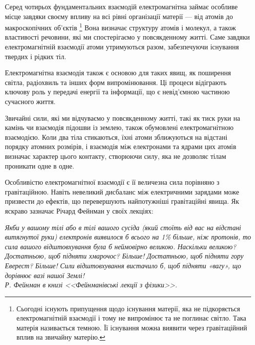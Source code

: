 Серед чотирьох фундаментальних взаємодій електромагнітна займає особливе місце завдяки своєму впливу на всі рівні організації матерії --- від атомів до
макроскопічних об’єктів
\footnote{Сьогодні існують припущення щодо існування матерії, яка не підкоряється електромагнітній взаємодії і тому не випромінює та не поглинає світло.
Така матерія називається темною. Її існування можна виявити через гравітаційний вплив на звичайну матерію.} Вона визначає структуру атомів і молекул, а
також властивості речовини, які ми спостерігаємо у повсякденному житті. Саме
завдяки електромагнітній взаємодії атоми утримуються разом, забезпечуючи існування твердих і рідких тіл.

Електромагнітна взаємодія також є основою для таких явищ, як поширення світла, радіохвиль та інших форм випромінювання. Ці процеси відіграють ключову
роль у передачі енергії та інформації, що є невід’ємною частиною сучасного життя.

Звичайні сили, які ми відчуваємо у повсякденному житті, такі як тиск руки на камінь чи взаємодія підошви із землею, також обумовлені електромагнітною
взаємодією. Коли два тіла стикаються, їхні атоми зближуються на відстані порядку атомних розмірів, і взаємодія між електронами та ядрами цих атомів
визначає характер цього контакту, створюючи силу, яка не дозволяє тілам проникати одне в одне.

Особливістю електромагнітної взаємодії є її величезна сила порівняно з гравітаційною. Навіть невеликий дисбаланс між електричними зарядами може
призвести до ефектів, що перевершують найпотужніші гравітаційні явища. Як яскраво зазначає Річард Фейнман у своїх лекціях:
\begin{tornpage}\small\itshape%
	\hspace{\parindent}Якби у вашому тілі або в тілі вашого сусіда (який стоїть від вас на відстані витягнутої руки) електронів виявилося б всього на 1\%
	більше, ніж протонів, то сила вашого відштовхування була б неймовірно великою. Наскільки великою? Достатньою, щоб підняти хмарочос? Більше!
	Достатньою,
	щоб підняти гору Еверест? Більше! Сили відштовхування вистачило б, щоб підняти «вагу», що дорівнює вазі нашої Землі!\\

	\hfill{ Р. Фейнман в книзі <<Фейнманівські лекції з фізики>>}.
\end{tornpage}
%


